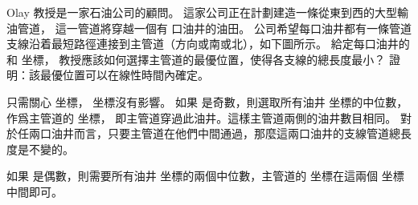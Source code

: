 Olay 教授是一家石油公司的顧問。
這家公司正在計劃建造一條從東到西的大型輸油管道，
這一管道將穿越一個有  口油井的油田。
公司希望每口油井都有一條管道支線沿着最短路徑連接到主管道（方向或南或北），如下圖所示。
給定每口油井的  和  坐標，
教授應該如何選擇主管道的最優位置，使得各支線的總長度最小？
證明：該最優位置可以在線性時間內確定。

\externalfigure[output/e9_3_9-1]
\stopEXERCISE

\startANSWER
只需關心  坐標，  坐標沒有影響。
如果  是奇數，則選取所有油井  坐標的中位數，作爲主管道的  坐標，
即主管道穿過此油井。這樣主管道兩側的油井數目相同。
對於任兩口油井而言，只要主管道在他們中間通過，那麼這兩口油井的支線管道總長度是不變的。

如果  是偶數，則需要所有油井  坐標的兩個中位數，主管道的  坐標在這兩個  坐標中間即可。
\stopANSWER

\stopsection
